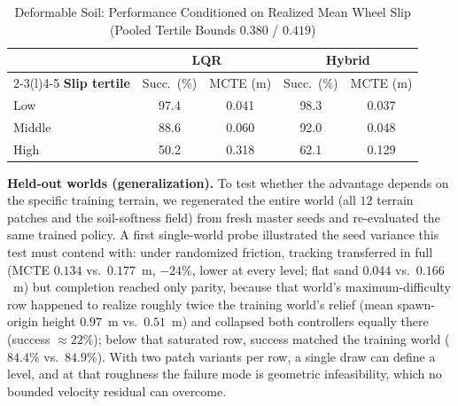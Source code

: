 \documentclass[conference]{IEEEtran}
\begin{document}
\begin{table}[t]
\centering
\caption{Deformable Soil: Performance Conditioned on Realized Mean Wheel Slip (Pooled Tertile Bounds $0.380$ / $0.419$)}
\label{tab:slip_tertiles}
{\footnotesize
\setlength{\tabcolsep}{4pt}
\begin{tabular}{@{}lcccc@{}}
\toprule
& \multicolumn{2}{c}{\textbf{LQR}} & \multicolumn{2}{c}{\textbf{Hybrid}} \\
\cmidrule(lr){2-3}\cmidrule(l){4-5}
\textbf{Slip tertile} & Succ.\ (\%) & MCTE (m) & Succ.\ (\%) & MCTE (m) \\
\midrule
Low & 97.4 & 0.041 & 98.3 & 0.037 \\
Middle & 88.6 & 0.060 & 92.0 & 0.048 \\
High & 50.2 & 0.318 & 62.1 & 0.129 \\
\bottomrule
\end{tabular}
}
\end{table}

\vspace{1mm}
\noindent\textbf{Held-out worlds (generalization).} To test whether the advantage depends on the specific training terrain, we regenerated the entire world (all $12$ terrain patches and the soil-softness field) from fresh master seeds and re-evaluated the same trained policy. A first single-world probe illustrated the seed variance this test must contend with: under randomized friction, tracking transferred in full (MCTE $0.134$ vs.\ $0.177$~m, $-24\%$, lower at every level; flat sand $0.044$ vs.\ $0.166$~m) but completion reached only parity, because that world's maximum-difficulty row happened to realize roughly twice the training world's relief (mean spawn-origin height $0.97$~m vs.\ $0.51$~m) and collapsed both controllers equally there (success $\approx 22\%$); below that saturated row, success matched the training world ($84.4\%$ vs.\ $84.9\%$). With two patch variants per row, a single draw can define a level, and at that roughness the failure mode is geometric infeasibility, which no bounded velocity residual can overcome.
\end{document}
